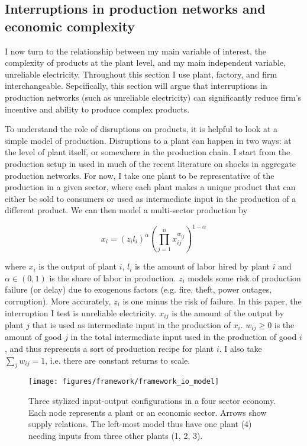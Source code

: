 \documentclass[11pt]{article}
\begin{document}
\subsection{Interruptions in production networks and economic complexity}
\label{sec:production_networks}
I now turn to the relationship between my main variable of interest, the complexity of products at the plant level, and my main independent variable, unreliable electricity. Throughout this section I use plant, factory, and firm interchangeable. Sepcifically, this section will argue that interruptions in production networks (such as unreliable electricity) can significantly reduce firm's incentive and ability to produce complex products.

To understand the role of disruptions on products, it is helpful to look at a simple model of production. Disruptions to a plant can happen in two ways: at the level of plant itself, or somewhere in the production chain. I start from the production setup in \cite{acemoglu_network_2012} used in much of the recent literature on shocks in aggregate production networks. For now, I take one plant to be representative of the production in a given sector, where each plant makes a unique product that can either be sold to consumers or used as intermediate input in the production of a different product. We can then model a multi-sector production by

\[
x_i =  (z_i l_i)^{\alpha}(\prod^{n}_{j = 1} x_{ij}^{w_{ij}})^{1 - \alpha}
\]

where $x_i$ is the output of plant $i$, \(l_i\) is the amount of labor hired by plant \(i\) and \(\alpha \in (0, 1)\) is the share of labor in production. \(z_i\) models some risk of production failure (or delay) due to exogenous factors (e.g. fire, theft, power outages, corruption). More accurately, \(z_i\) is one minus the risk of failure. In this paper, the interruption I test is unreliable electricity. \(x_{ij}\) is the amount of the output by plant \(j\) that is used as intermediate input in the production of \(x_i\). \(w_{ij} \geq 0\) is the amount of good \(j\) in the total intermediate input used in the production of good \(i\), and thus represents a sort of production recipe for plant \(i\). I also take \(\sum_j w_{ij} = 1\), i.e. there are constant returns to scale.

\begin{figure}[htpb]
	\centering
	\texttt{[image: figures/framework/framework\_io\_model]}
	\caption[Three input-output configurations]{Three stylized input-output configurations in a four sector economy. Each node represents a plant or an economic sector. Arrows show supply relations. The left-most model thus have one plant (4) needing inputs from three other plants (1, 2, 3).}%
	\label{fig:framework-io-model}
\end{figure}
\end{document}
